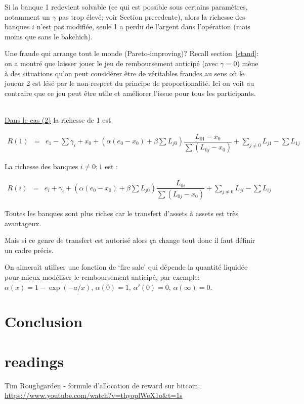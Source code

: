 \documentclass{article}
\def\ga{\gamma}
\def\AR#1{
\[
\begin{array}{llllllll}
#1
\end{array}
\]
}
\begin{document}
Si la banque 1 redevient solvable (ce qui est possible sous certains paramètres, notamment un $\gamma$ pas trop élevé; voir Section precedente), alors la richesse des banques $i$ n'est pas modifiée, seule 1 a perdu de l'argent dans l'opération (mais moins que sans le bakchich).

Une fraude qui arrange tout le monde (Pareto-improving)?
Recall section~\ref{stand}: on a montré que laisser jouer le jeu de remboursement anticipé (avec $\ga=0$)
mène à des situations qu'on peut considérer être de véritables fraudes au sens où le joueur 2 est lésé par le non-respect du principe de proportionalité. Ici on voit au contraire que ce jeu peut être utile et améliorer l'issue pour tous les participants.
\

\underline{Dans le cas (2)} la richesse de 1 est

\AR{
R(1) 
&=&
e_1 - 
\sum \gamma_i +
x_0 +
(\alpha (e_0 - x_0) + \beta \sum L_{j0})
 \dfrac
{L_{01}- x_0}
{\sum (L_{0j} - x_0)} + 
\sum_{j \neq 0} L_{j1}-
\sum L_{1j}
}

La richesse des banques $i\neq 0; 1$ est : 

\AR{
R(i) 
&=&
e_i +
\gamma_i +
(\alpha (e_0 - x_0) + \beta \sum L_{j0})
 \dfrac
{L_{0i}}
{\sum (L_{0j} - x_0)} + 
\sum_{j \neq 0} L_{ji}-
\sum L_{ij}
}

Toutes les banques sont plus riches car le transfert d'assets à assets est très avantageux.

Mais si ce genre de transfert est autorisé alors ça change tout donc il faut définir un cadre précis.

On aimerait utiliser une fonction de `fire sale' qui dépende la quantité liquidée pour mieux modéliser le remboursement anticipé, par exemple:
$\alpha(x) = 1 - \exp(-a/x)$, 
$\alpha(0)=1$, 
$\alpha'(0)=0$, 
$\alpha(\infty)=0$.


\section{Conclusion}
































\section{readings}

Tim Roughgarden - formule d'allocation de reward sur bitcoin: \url{https://www.youtube.com/watch?v=thyoplWeX1o&t=1s}
\end{document}
